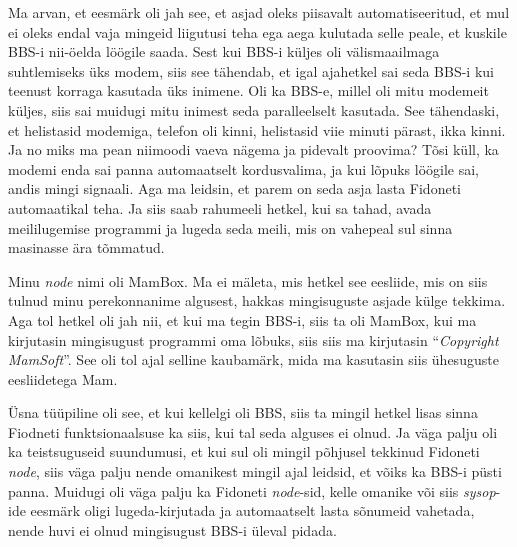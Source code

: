 Ma arvan, et eesmärk oli jah see, et asjad oleks piisavalt automatiseeritud, et 
mul ei oleks endal vaja mingeid liigutusi teha  ega aega kulutada selle peale, et 
kuskile BBS-i nii-öelda löögile saada. Sest kui BBS-i küljes oli  
välismaailmaga suhtlemiseks üks modem, siis see tähendab, et igal ajahetkel sai 
seda BBS-i kui teenust korraga kasutada üks inimene. Oli ka BBS-e, millel oli mitu 
modemeit küljes, siis sai muidugi mitu inimest seda paralleelselt kasutada.  
See tähendaski, et helistasid modemiga, telefon oli kinni, helistasid viie minuti 
pärast, ikka kinni. Ja no miks ma pean niimoodi vaeva nägema ja pidevalt 
proovima? Tõsi küll, ka modemi enda sai panna automaatselt kordusvalima, 
ja kui lõpuks löögile sai, andis mingi signaali. Aga ma leidsin, et parem on 
seda asja lasta  Fidoneti automaatikal teha. Ja siis  saab  rahumeeli hetkel, 
kui sa tahad, avada meililugemise programmi ja lugeda seda meili, mis on 
vahepeal sul sinna masinasse ära tõmmatud. 


Minu \emph{node} nimi oli MamBox. Ma ei mäleta, mis hetkel see eesliide, mis on 
siis tulnud minu perekonnanime algusest,  hakkas mingisuguste asjade külge 
tekkima. Aga tol hetkel oli jah nii, et kui ma tegin BBS-i, siis ta oli MamBox, 
kui ma kirjutasin mingisugust programmi  oma lõbuks, siis siis ma kirjutasin 
\enquote{\emph{Copyright MamSoft}}. See oli tol ajal selline kaubamärk, mida ma kasutasin siis 
ühesuguste eesliidetega Mam.

Üsna tüüpiline oli see, et kui kellelgi oli BBS, siis 
ta mingil hetkel lisas sinna  Fiodneti funktsionaalsuse ka siis, kui tal seda 
alguses ei olnud. Ja väga palju oli ka teistsuguseid suundumusi, et kui sul oli 
mingil põhjusel tekkinud Fidoneti \emph{node}, siis väga palju nende  omanikest 
mingil ajal leidsid, et võiks  ka BBS-i püsti panna. 
Muidugi oli väga palju ka Fidoneti \emph{node}-sid, kelle omanike või siis 
\emph{sysop}-ide eesmärk oligi lugeda-kirjutada ja automaatselt lasta sõnumeid 
vahetada,  nende huvi ei olnud mingisugust BBS-i üleval pidada.



